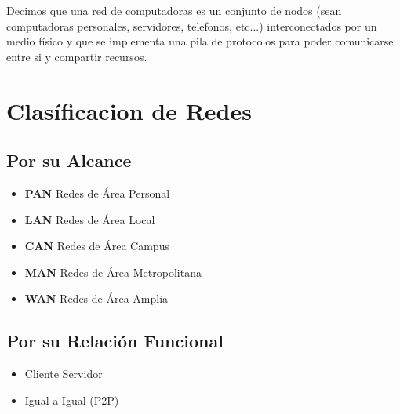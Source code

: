 \documentclass[12pt, fleqn]{report}                             %
\theoremstyle{break}                                            %
\begin{document}
                Decimos que una red de computadoras es un conjunto de nodos (sean computadoras personales, 
                servidores, telefonos, etc...) interconectados por un medio físico y que se implementa
                una pila de protocolos para poder comunicarse entre si y compartir recursos.


        \clearpage
        \section{Clasíficacion de Redes}

            \subsection{Por su Alcance}

                \begin{itemize}
                    \item \textbf{PAN} Redes de Área Personal
                    \item \textbf{LAN} Redes de Área Local
                    \item \textbf{CAN} Redes de Área Campus
                    \item \textbf{MAN} Redes de Área Metropolitana
                    \item \textbf{WAN} Redes de Área Amplia
                \end{itemize}


            \subsection{Por su Relación Funcional}

                \begin{itemize}
                    \item Cliente Servidor
                    \item Igual a Igual (P2P)
                \end{itemize}
\end{document}
